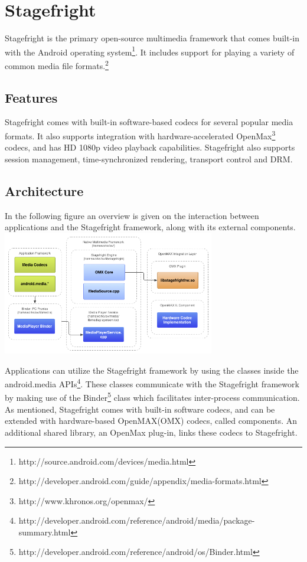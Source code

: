 \section{Stagefright}
Stagefright is the primary open-source multimedia framework that comes built-in with the Android operating system\footnote{http://source.android.com/devices/media.html}. It includes support for playing a variety of common media file formats.\footnote{http://developer.android.com/guide/appendix/media-formats.html}
\subsection{Features}
Stagefright comes with built-in software-based codecs for several popular media formats. It also supports integration with hardware-accelerated OpenMax\footnote{http://www.khronos.org/openmax/} codecs, and has HD 1080p video playback capabilities. Stagefright also supports session management, time-synchronized rendering, transport control and DRM.
\subsection{Architecture}
In the following figure an overview is given on the interaction between applications and the Stagefright framework, along with its external components.\\

\includegraphics[width=350px]{contents/orientation/video_decoding/native.png}

Applications can utilize the Stagefright framework by using the classes inside the android.media APIs\footnote{http://developer.android.com/reference/android/media/package-summary.html}. These classes communicate with the Stagefright framework by making use of the Binder\footnote{http://developer.android.com/reference/android/os/Binder.html} class which facilitates inter-process communication. As mentioned, Stagefright comes with built-in software codecs, and can be extended with hardware-based OpenMAX(OMX) codecs, called components. An additional shared library, an OpenMax plug-in, links these codecs to Stagefright.

